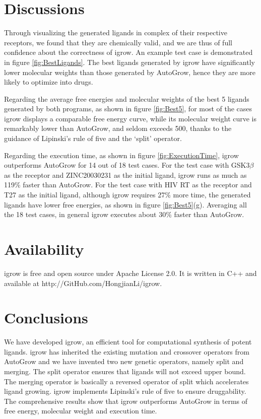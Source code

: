 \documentclass[10pt, conference, compsocconf]{../IEEEtran}
\begin{document}
\section{Discussions}

Through visualizing the generated ligands in complex of their respective receptors, we found that they are chemically valid, and we are thus of full confidence about the correctness of igrow. An example test case is demonstrated in figure \ref {fig:BestLigands}.
The best ligands generated by igrow have significantly lower molecular weights than those generated by AutoGrow, hence they are more likely to optimize into drugs.

Regarding the average free energies and molecular weights of the best 5 ligands generated by both programs, as shown in figure \ref{fig:Best5}, for most of the cases igrow displays a comparable free energy curve, while its molecular weight curve is remarkably lower than AutoGrow, and seldom exceeds 500, thanks to the guidance of Lipinski's rule of five and the `split' operator.

Regarding the execution time, as shown in figure \ref{fig:ExecutionTime}, igrow outperforms AutoGrow for 14 out of 18 test cases.
For the test case with GSK3$\beta$ as the receptor and ZINC20030231 as the initial ligand, igrow runs as much as 119\% faster than AutoGrow.
For the test case with HIV RT as the receptor and T27 as the initial ligand, although igrow requires 27\% more time, the generated ligands have lower free energies, as shown in figure \ref{fig:Best5}(g).
Averaging all the 18 test cases, in general igrow executes about 30\% faster than AutoGrow.

\section{Availability}

igrow is free and open source under Apache License 2.0. It is written in C++ and available at http://GitHub.com/HongjianLi/igrow.

\section{Conclusions}

We have developed igrow, an efficient tool for computational synthesis of potent ligands.
igrow has inherited the existing mutation and crossover operators from AutoGrow and we have invented two new genetic operators, namely split and merging.
The split operator ensures that ligands will not exceed upper bound.
The merging operator is basically a reversed operator of split which accelerates ligand growing.
igrow implements Lipinski's rule of five to ensure druggability.
The comprehensive results show that igrow outperforms AutoGrow in terms of free energy, molecular weight and execution time.



\end{document}
